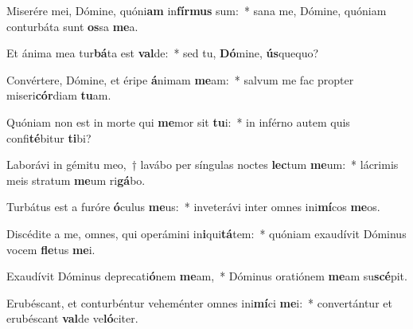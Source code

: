 \item Miserére mei, Dómine, quóni\textbf{am} in\textbf{fír}\textbf{mus} sum:~* sana me, Dómine, quóniam conturbáta sunt \textbf{os}sa \textbf{me}a.
\item Et ánima mea tur\textbf{bá}ta est \textbf{val}de:~* sed tu, \textbf{Dó}mine, \textbf{ús}quequo?
\item Convértere, Dómine, et éripe \textbf{á}nimam \textbf{me}am:~* salvum me fac propter miseri\textbf{cór}diam \textbf{tu}am.
\item Quóniam non est in morte qui \textbf{me}mor sit \textbf{tu}i:~* in inférno autem quis confi\textbf{té}bitur \textbf{ti}bi?
\item Laborávi in gémitu meo,~† lavábo per síngulas noctes \textbf{lec}tum \textbf{me}um:~* lácrimis meis stratum \textbf{me}um ri\textbf{gá}bo.
\item Turbátus est a furóre \textbf{ó}culus \textbf{me}us:~* inveterávi inter omnes ini\textbf{mí}cos \textbf{me}os.
\item Discédite a me, omnes, qui operámini in\textbf{i}qui\textbf{tá}tem:~* quóniam exaudívit Dóminus vocem \textbf{fle}tus \textbf{me}i.
\item Exaudívit Dóminus deprecati\textbf{ó}nem \textbf{me}am,~* Dóminus oratiónem \textbf{me}am su\textbf{scé}pit.
\item Erubéscant, et conturbéntur veheménter omnes ini\textbf{mí}ci \textbf{me}i:~* convertántur et erubéscant \textbf{val}de ve\textbf{ló}citer.
